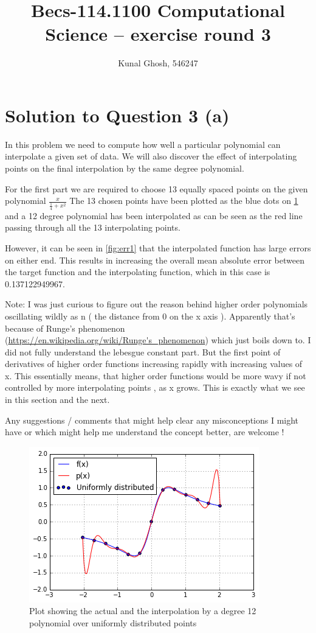 \documentclass[a4paper,11pt]{article}
\begin{document}
\title{Becs-114.1100 Computational Science -- exercise round 3} %
\author{Kunal Ghosh, 546247} %
\maketitle
\section{Solution to Question 3 (a)}\label{prob3a}

In this problem we need to compute how well a particular polynomial can interpolate a given set of data. We will also discover the effect of interpolating points on the final interpolation by the same degree polynomial.

For the first part we are required to choose 13 equally spaced points on the given polynomial $\frac{x}{\frac{1}{4} + x^2}$ The 13 chosen points have been plotted as the blue dots on \ref{fig:fig1} and a 12 degree polynomial has been interpolated as can be seen as the red line passing through all the 13 interpolating points.

However, it can be seen in \ref{fig:err1} that the interpolated function has large errors on either end. This results in increasing the overall mean absolute error between the target function and the interpolating function, which in this case is 0.137122949967.

Note:
I was just curious to figure out the reason behind higher order polynomials oscillating wildly as n ( the distance from 0 on the x axis ). Apparently that's because of Runge's phenomenon (\url{https://en.wikipedia.org/wiki/Runge's_phenomenon}) which just boils down to. I did not fully understand the lebesgue constant part. But the first point of derivatives of higher order functions increasing rapidly with increasing values of x. This essentially means, that higher order functions would be more wavy if not controlled by more interpolating points , as x grows. This is exactly what we see in this section and the next.

Any suggestions / comments that might help clear any misconceptions I might have or which might help me understand the concept better, are welcome !
 
	
\begin{figure}[h]
	\center
	\includegraphics[scale=0.65]{fig1.png}
	\caption{Plot showing the actual and the interpolation by a degree 12 polynomial over uniformly distributed points}
	\label{fig:fig1}
\end{figure}
\end{document}
